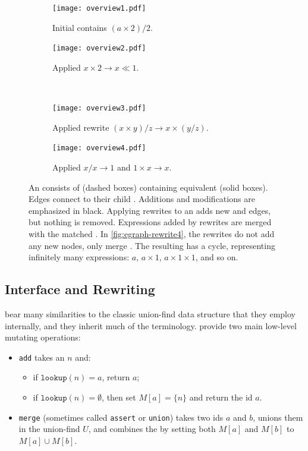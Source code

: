 \begin{figure}
  \begin{subfigure}[t]{0.45\linewidth}
    \centering
    \texttt{[image: overview1.pdf]}
    \caption{Initial \egraph contains ${(a \times 2) / 2}$.}
    \label{fig:egraph-rewrite1}
  \end{subfigure}
  \hfill
  \begin{subfigure}[t]{0.45\linewidth}
    \centering
    \texttt{[image: overview2.pdf]}
    \caption{
      Applied ${x \times 2 \to x \ll 1}$.
    }\label{fig:egraph-rewrite2}
  \end{subfigure}
  \\[1em]
  \begin{subfigure}[t]{0.45\linewidth}
    \centering
    \texttt{[image: overview3.pdf]}
    \caption{
      Applied rewrite ${(x \times y) / z \to x \times (y / z)}$.
    }\label{fig:egraph-rewrite3}
  \end{subfigure}
  \hfill
  \begin{subfigure}[t]{0.45\linewidth}
    \centering
    \texttt{[image: overview4.pdf]}
    \caption{
      Applied ${x / x \to 1}$ and ${1 \times x \to x}$.
    }\label{fig:egraph-rewrite4}
  \end{subfigure}
  \caption{
    An \egraph consists of \eclasses (dashed boxes) containing
      equivalent \enodes (solid boxes).
    Edges connect \enodes to their child \eclasses.
    Additions and modifications are emphasized in black.
    Applying rewrites to an \egraph adds new \enodes and edges,
      but nothing is removed.
    Expressions added by rewrites are merged with the matched \eclass.
    In \autoref{fig:egraph-rewrite4}, the rewrites do not add any new nodes,
      only merge \eclasses.
    The resulting \egraph has a cycle,
      representing infinitely many expressions:
      $a$, $a \times 1$, $a \times 1 \times 1$, and so on.
  }
  \label{fig:egraph-rewrite}
\end{figure}

\subsection{Interface and Rewriting}
\label{sec:interface}

\Egraphs bear many similarities to the classic union-find data
  structure that they employ internally,
  and they inherit much of the terminology.
\Egraphs provide two main low-level mutating operations:
\begin{itemize}
    \item \texttt{add} takes an \enode $n$ and:
    \begin{itemize}
        \item if $\texttt{lookup}(n) = a$, return $a$;
        \item if $\texttt{lookup}(n) = \emptyset$,
              then set $M[a] = \{ n \}$ and return the id $a$.
    \end{itemize}
    \item \texttt{merge} (sometimes called \texttt{assert} or \texttt{union})
    takes two \eclass ids $a$ and $b$,
    unions them in the union-find $U$,
    and combines the \eclasses by setting both $M[a]$ and $M[b]$ to $M[a] \cup M[b]$.
\end{itemize}

